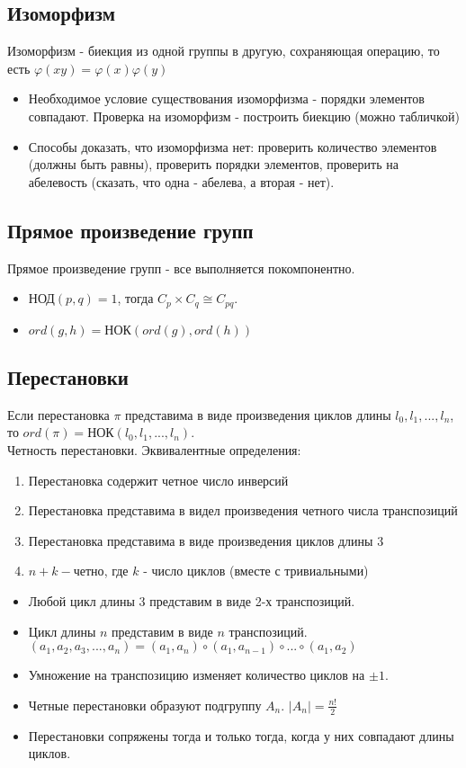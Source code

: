 \documentclass[11pt,a4paper]{article}
\begin{document}
		\subsection*{Изоморфизм} Изоморфизм - биекция из одной группы в другую, сохраняющая операцию, то есть $\varphi(xy) = \varphi(x)\varphi(y)$
		\begin{itemize}
			\item Необходимое условие существования изоморфизма - порядки элементов совпадают.
			Проверка на изоморфизм - построить биекцию (можно табличкой)
			\item Способы доказать, что изоморфизма нет: проверить количество элементов (должны быть равны), проверить порядки элементов, проверить на абелевость (сказать, что одна - абелева, а вторая - нет).
		\end{itemize}
	
		\subsection*{Прямое произведение групп} Прямое произведение групп - все выполняется покомпонентно.
		\begin{itemize}
			\item НОД$(p, q) = 1$, тогда $C_p \times C_q \cong C_{pq}$.
			\item $ord(g, h) = \text{НОК}(ord(g), ord(h)) $
		\end{itemize}

		
		\subsection*{ Перестановки} 
		Если перестановка $\pi$ представима в виде произведения циклов длины $l_0, l_1, ..., l_n$, то $ord(\pi) = \text{НОК}(l_0, l_1, ..., l_n)$. \\
		Четность перестановки. Эквивалентные определения:
		\begin{enumerate}
			\item Перестановка содержит четное число инверсий
			\item Перестановка представима в видел произведения четного числа транспозиций
			\item Перестановка представима в виде произведения циклов длины 3
			\item $n + k - \text{четно}$, где $k$ - число циклов (вместе с тривиальными)
		\end{enumerate}
		\begin{itemize}
			\item Любой цикл длины 3 представим в виде 2-х транспозиций.
			\item Цикл длины $n$ представим в виде $n$ транспозиций. $(a_1, a_2, a_3, ..., a_n) = (a_1, a_n) \circ (a_1, a_{n - 1}) \circ ... \circ (a_1, a_2) $
			\item Умножение на транспозицию изменяет количество циклов на $\pm 1$.
			\item Четные перестановки образуют подгруппу $A_n$. $|A_n| = \frac{n!}{2}$
			\item Перестановки сопряжены тогда и только тогда, когда у них совпадают длины циклов.
		\end{itemize}
		
\end{document}
